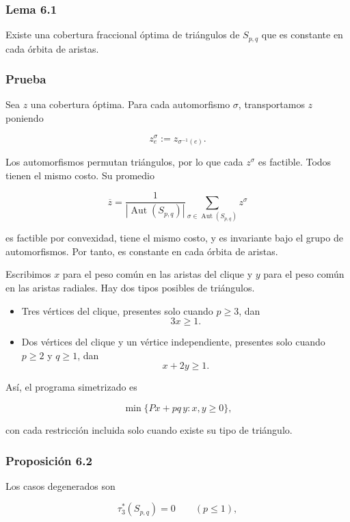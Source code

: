 \documentclass[
  11pt,
]{article}
\providecommand{\tightlist}{%
  \setlength{\itemsep}{0pt}\setlength{\parskip}{0pt}}
\begin{document}
\subsubsection{Lema 6.1}\label{lema-6.1}

Existe una cobertura fraccional óptima de triángulos de \(S_{p,q}\) que
es constante en cada órbita de aristas.

\subsubsection{Prueba}\label{prueba-8}

Sea \(z\) una cobertura óptima. Para cada automorfismo \(\sigma\),
transportamos \(z\) poniendo

\[
z^\sigma_e:=z_{\sigma^{-1}(e)}.
\]

Los automorfismos permutan triángulos, por lo que cada \(z^\sigma\) es
factible. Todos tienen el mismo costo. Su promedio

\[
\overline z
=
\frac{1}{|\operatorname{Aut}(S_{p,q})|}
\sum_{\sigma\in\operatorname{Aut}(S_{p,q})}z^\sigma
\]

es factible por convexidad, tiene el mismo costo, y es invariante bajo
el grupo de automorfismos. Por tanto, es constante en cada órbita de
aristas.

Escribimos \(x\) para el peso común en las aristas del clique y \(y\)
para el peso común en las aristas radiales. Hay dos tipos posibles de
triángulos.

\begin{itemize}
\tightlist
\item
  Tres vértices del clique, presentes solo cuando \(p\ge3\), dan \[
  3x\ge1.
  \]
\item
  Dos vértices del clique y un vértice independiente, presentes solo
  cuando \(p\ge2\) y \(q\ge1\), dan \[
  x+2y\ge1.
  \]
\end{itemize}

Así, el programa simetrizado es

\[
\min\{Px+pq\,y:x,y\ge0\},
\]

con cada restricción incluida solo cuando existe su tipo de triángulo.

\subsubsection{Proposición 6.2}\label{proposiciuxf3n-6.2}

Los casos degenerados son

\[
\tau_3^*(S_{p,q})=0
\qquad
(p\le1),
\]
\end{document}
